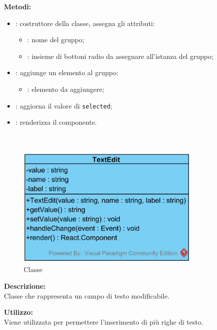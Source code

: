 \textbf{Metodi:}
\begin{itemize}
	\item {}: costruttore della classe, assegna gli attributi:
	\begin{itemize}
		\item {}: nome del gruppo;
		\item {}: insieme di bottoni radio da assegnare all'istanza del gruppo;
	\end{itemize}
	\item {}: aggiunge un elemento al gruppo:
	\begin{itemize}
		\item {}: elemento da aggiungere;
	\end{itemize}
	\item {}: aggiorna il valore di \texttt{selected};
	\item {}: renderizza il componente.
\end{itemize}


\paragraph[::TextEdit]{\class}\mbox{}\\ \label{\class}
\begin{figure}[H]
	\centering
	\includegraphics[width=9cm]{./diagrammi/framework/view/gui/textedit.png}
	\caption{Classe \class}
\end{figure}
\textbf{Descrizione:}\\
Classe che rappresenta un campo di testo modificabile.

\textbf{Utilizzo:}\\
Viene utilizzata per permettere l'inserimento di più righe di testo.

